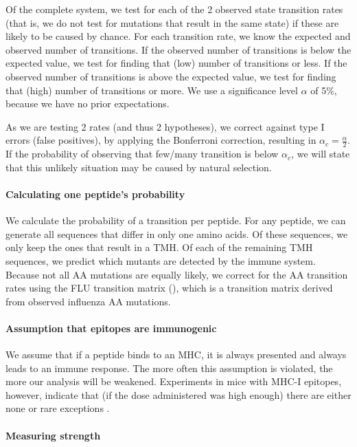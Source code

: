 Of the complete system, we test for each of the 2 observed 
state transition rates (that is, we do not test for mutations that result in the same state)
if these are likely to be caused by chance.
For each transition rate, we know the expected and observed number
of transitions. If the observed number of transitions is below the expected
value, we test for finding that (low) number of transitions or less.
If the observed number of transitions is above the expected
value, we test for finding that (high) number of transitions or more.
We use a significance level $\alpha$ of 5\%, because we have no prior
expectations. 

As we are testing 2 rates (and thus 2 hypotheses), 
we correct against type I errors (false positives), 
by applying the Bonferroni correction, 
resulting in $\alpha_c = \frac{\alpha}{2}$.
If the probability of observing that few/many 
transition is below $\alpha_c$, we will state 
that this unlikely situation may be caused by natural selection.

\paragraph{Calculating one peptide's probability}

We calculate the probability of a transition per peptide.
For any peptide, we can generate all sequences that differ
in only one amino acids. Of these sequences, we only keep the ones
that result in a TMH. Of each of the remaining TMH sequences, we predict
which mutants are detected by the immune system. Because not all 
AA mutations are equally likely, we correct for the AA transition
rates using the FLU transition matrix (\cite{dang2010flu}),
which is a transition matrix derived from observed influenza AA mutations.

\paragraph{Assumption that epitopes are immunogenic}

We assume that if a peptide binds to an MHC, it is always presented and always
leads to an immune response.
The more often this assumption is violated, 
the more our analysis will be weakened.
Experiments in mice with MHC-I epitopes, however, indicate that (if the dose 
administered was high enough) there are either none or rare
exceptions \cite{sette1994relationship}.

\paragraph{Measuring strength}

